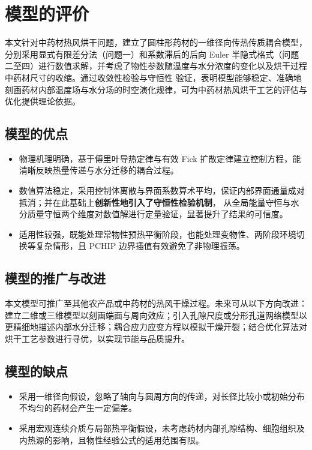 \documentclass[withoutpreface,bwprint]{cumcm_thesis}
\begin{document}
\section{模型的评价}

本文针对中药材热风烘干问题，建立了圆柱形药材的一维径向传热传质耦合模型，分别采用显式有限差分法（问题一）和系数滞后的后向 Euler 
半隐式格式（问题二至四）进行数值求解，并考虑了物性参数随温度与水分浓度的变化以及烘干过程中药材尺寸的收缩。通过收敛性检验与守恒性
验证，表明模型能够稳定、准确地刻画药材内部温度场与水分场的时空演化规律，可为中药材热风烘干工艺的评估与优化提供理论依据。

\subsection{模型的优点}
\begin{itemize}[itemindent=2em]
\item 物理机理明确，基于傅里叶导热定律与有效 Fick 扩散定律建立控制方程，能清晰反映热量传递与水分迁移的耦合过程。
\item 数值算法稳定，采用控制体离散与界面系数算术平均，保证内部界面通量成对抵消；并在此基础上\textbf{创新性地引入了守恒性检验机制}，
从全局能量守恒与水分质量守恒两个维度对数值解进行定量验证，显著提升了结果的可信度。
\item 适用性较强，既能处理常物性预热平衡阶段，也能处理变物性、两阶段环境切换等复杂情形，且 PCHIP 边界插值有效避免了非物理振荡。
\end{itemize}

\subsection{模型的推广与改进}
本文模型可推广至其他农产品或中药材的热风干燥过程。未来可从以下方向改进：建立二维或三维模型以刻画端面与周向效应；引入孔隙尺度或分形孔道网络模型以更精细地描述内部水分迁移；耦合应力应变方程以模拟干燥开裂；结合优化算法对烘干工艺参数进行寻优，以实现节能与品质提升。

\subsection{模型的缺点}
\begin{itemize}[itemindent=2em]
\item 采用一维径向假设，忽略了轴向与圆周方向的传递，对长径比较小或初始分布不均匀的药材会产生一定偏差。
\item 采用宏观连续介质与局部热平衡假设，未考虑药材内部孔隙结构、细胞组织及内热源的影响，且物性经验公式的适用范围有限。
\end{itemize}
\end{document}
